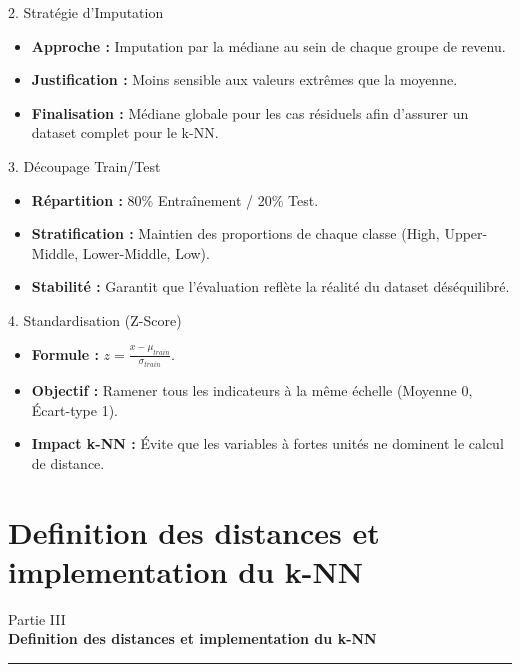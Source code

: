 \documentclass{beamer}
\begin{document}
\begin{frame}{2. Stratégie d'Imputation}
    \begin{itemize}
        \item \textbf{Approche :} Imputation par la médiane au sein de chaque groupe de revenu.
        \item \textbf{Justification :} Moins sensible aux valeurs extrêmes que la moyenne.
        \item \textbf{Finalisation :} Médiane globale pour les cas résiduels afin d'assurer un dataset complet pour le k-NN.
    \end{itemize}
\end{frame}

\begin{frame}{3. Découpage Train/Test}
    \begin{itemize}
        \item \textbf{Répartition :} 80\% Entraînement / 20\% Test.
        \item \textbf{Stratification :} Maintien des proportions de chaque classe (High, Upper-Middle, Lower-Middle, Low).
        \item \textbf{Stabilité :} Garantit que l'évaluation reflète la réalité du dataset déséquilibré.
    \end{itemize}
\end{frame}

\begin{frame}{4. Standardisation (Z-Score)}
    \begin{itemize}
        \item \textbf{Formule :} $z = \frac{x - \mu_{train}}{\sigma_{train}}$.
        \item \textbf{Objectif :} Ramener tous les indicateurs à la même échelle (Moyenne 0, Écart-type 1).
        \item \textbf{Impact k-NN :} Évite que les variables à fortes unités ne dominent le calcul de distance.
    \end{itemize}
\end{frame}

\section{Definition des distances et implementation du k-NN}

\begin{frame}{}
\centering
\vspace{1.2cm}
{ Partie III}\\[0.5cm]
{\Large \textbf{Definition des distances et implementation du k-NN}}\\[0.3cm]
\rule{0.5\textwidth}{0.4pt}
\end{frame}
\end{document}

